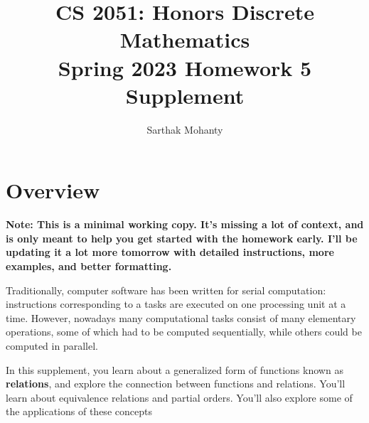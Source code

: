 \documentclass{article}
\title{\vspace{-1cm}CS 2051: Honors Discrete Mathematics \\Spring 2023 Homework 5 Supplement}
\author{Sarthak Mohanty }
\date{}
\begin{document}
\maketitle

\section*{Overview}
    \textbf{Note: This is a minimal working copy. It's missing a lot of context, and is only meant to help you get started with the homework early. I'll be updating it a lot more tomorrow with detailed instructions, more examples, and better formatting.}

    \vspace{2mm}
    Traditionally, computer software has been written for serial computation: instructions corresponding to a tasks are executed on one processing unit at a time. However, nowadays many computational tasks consist of many elementary operations, some of which had to be computed sequentially, while others could be computed in parallel. 



    

    \vspace{2mm}
    In this supplement, you learn about a generalized form of functions known as \textbf{relations}, and explore the connection between functions and relations. You'll learn about equivalence relations and partial orders. You'll also explore some of the applications of these concepts
\end{document}
